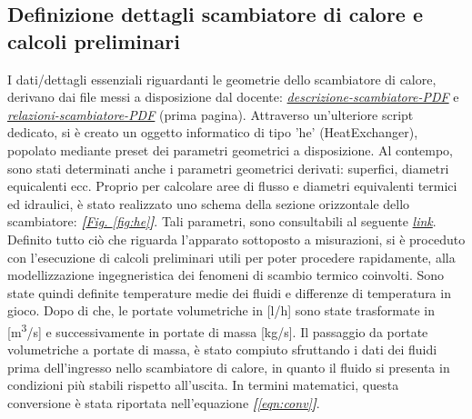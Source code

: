 \documentclass[a4paper,10pt]{article}                                                                                       %
\begin{document}
\subsection{Definizione dettagli scambiatore di calore e calcoli preliminari}                                               %
\label{subsec:hedef_prelcalcs}                                                                                              %
  I dati/dettagli essenziali riguardanti le geometrie dello scambiatore di calore, derivano dai file messi a disposizione
  dal docente:
  \textit{\href{https://github.com/CristianMerli/DataAnalysis/blob/master/lab_doc/DescrizioneScambiatore.pdf}{descrizione-scambiatore-PDF}}
  e \textit{\href{https://github.com/CristianMerli/DataAnalysis/blob/master/lab_doc/RelazioniScambiatore.pdf}{relazioni-scambiatore-PDF}}
  (prima pagina). Attraverso un'ulteriore script dedicato, si è creato un oggetto informatico di tipo 'he' (HeatExchanger),
  popolato mediante preset dei parametri geometrici a disposizione. Al contempo, sono stati determinati anche i parametri
  geometrici derivati: superfici, diametri equicalenti ecc. Proprio per calcolare aree di flusso e diametri equivalenti
  termici ed idraulici, è stato realizzato uno schema della sezione orizzontale dello scambiatore:
  \textit{\textbf{[}\hyperref[fig:he]{Fig. }\ref{fig:he}\textbf{]}}. Tali parametri, sono consultabili al seguente
  \textit{\href{https://github.com/CristianMerli/DataAnalysis/blob/master/final_doc/code_exports/output/he.txt}{link}}.
  Definito tutto ciò che riguarda l'apparato sottoposto a misurazioni, si è proceduto con l'esecuzione di calcoli
  preliminari utili per poter procedere rapidamente, alla modellizzazione ingegneristica dei fenomeni di scambio termico
  coinvolti. Sono state quindi definite temperature medie dei fluidi e differenze di temperatura in gioco. Dopo di che, le
  portate volumetriche in [l/h] sono state trasformate in [m\textsuperscript{3}/s] e successivamente in portate di massa
  [kg/s]. Il passaggio da portate volumetriche a portate di massa, è stato compiuto sfruttando i dati dei fluidi prima
  dell'ingresso nello scambiatore di calore, in quanto il fluido si presenta in condizioni più stabili rispetto
  all'uscita. In termini matematici, questa conversione è stata riportata nell'equazione
  \textit{\textbf{[}\ref{eqn:conv}\textbf{]}}.
\end{document}
